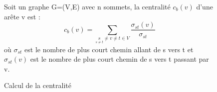 \begin{figure}[H]
   \centering
   \frame
   {
      \hspace{1em}
      \parbox{12cm}
      {
         \vspace{1em}Soit un graphe G=(V,E) avec n sommets, la centralité $c_b(v)$ d'une arête v est :
         \begin{equation}
               c_b(v) = \sum_{\underset{s \neq t}s \neq v \neq t \in V} \frac{\sigma_{st}(v)}{\sigma_{st}}
         \end{equation}
	o\`u $\sigma_{st}$ est le nombre de plus court chemin allant de s vers t et $\sigma_{st}(v)$ est le nombre de plus court chemin de s vers t passant par v.
      \vspace{1em}
      }\hspace{1em}
   }

  \caption{\label{centralit\'e}Calcul de la centralit\'e}
\end{figure}


%
